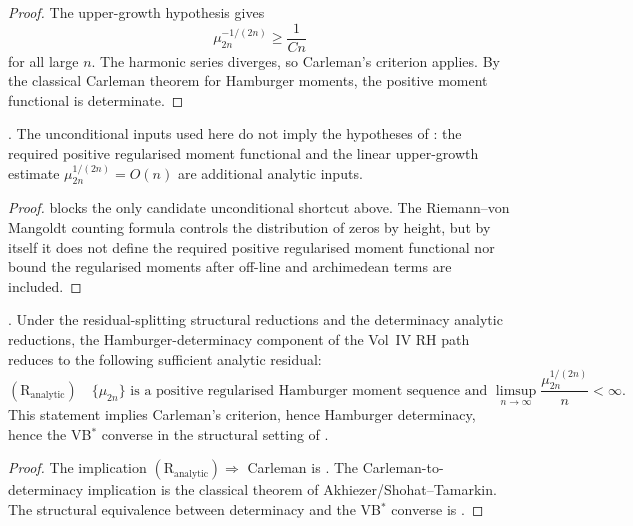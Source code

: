 \begin{proof}
The upper-growth hypothesis gives
\[
 \mu_{2n}^{-1/(2n)}\ge \frac{1}{Cn}
\]
for all large \(n\). The harmonic series diverges, so Carleman's
criterion applies. By the classical Carleman theorem for Hamburger
moments, the positive moment functional is determinate.
\end{proof}

\begin{corollary}
\label{v4-arith:hpar-det:cor:unconditional-gap}
\ClaimStatusProvedHere. The unconditional inputs used here do not imply the hypotheses of
: the required positive regularised moment functional and the
linear upper-growth estimate \(\mu_{2n}^{1/(2n)}=O(n)\) are additional
analytic inputs.
\end{corollary}

\begin{proof}
 blocks the only
candidate unconditional shortcut above. The
Riemann--von Mangoldt counting formula controls the distribution of
zeros by height, but by itself it does not define the required
positive regularised moment functional nor bound the regularised
moments after off-line and archimedean terms are included.
\end{proof}

\begin{theorem}
\label{v4-arith:hpar-det:thm:single-analytic-residual}
\ClaimStatusProvedHere. Under the residual-splitting structural reductions and the determinacy analytic reductions, the Hamburger-determinacy component
of the Vol~IV RH path reduces to the following sufficient analytic
residual:
\begin{equation}
\label{v4-arith:hpar-det:eq:single-residual}
(\mathrm{R}_{\mathrm{analytic}})\quad
\text{\(\{\mu_{2n}\}\) is a positive regularised Hamburger moment
sequence and }\limsup_{n\to\infty}\frac{\mu_{2n}^{1/(2n)}}{n}<\infty.
\end{equation}
This statement implies Carleman's criterion, hence Hamburger
determinacy, hence the VB\(^{*}\) converse in the structural setting
of .
\end{theorem}

\begin{proof}
The implication
\((\mathrm{R}_{\mathrm{analytic}})\Rightarrow\) Carleman is
. The
Carleman-to-determinacy implication is the classical theorem of
Akhiezer/Shohat--Tamarkin. The structural equivalence between
determinacy and the VB\(^{*}\) converse is
.
\end{proof}

